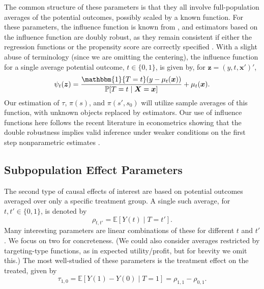 \documentclass[11pt]{article}
\numberwithin{equation}{section}
\theoremstyle{definition}
\newcommand{\E}{\mathbb{E}}
\renewcommand{\P}{\mathbb{P}}
\newcommand{\One}{\mathbbm{1}}
\newcommand{\bz}{\bm{z}}
\newcommand{\bx}{\bm{x}}
\newcommand{\bX}{\bm{X}}
\begin{document}
The common structure of these parameters is that they all involve full-population averages of the potential outcomes, possibly scaled by a known function. For these parameters, the influence function is known from \cite{Hahn1998_Ecma}, and estimators based on the influence function are doubly robust, as they remain consistent if either the regression functions or the propensity score are correctly specified \citep{Robins-Rotnitzky-Zhao1994_JASA,Robins-Rotnitzky-Zhao1995_JASA}. With a slight abuse of terminology (since we are omitting the centering), the influence function for a single average potential outcome, $t \in \{0,1\}$, is given by, for $\bz = (y, t, \bx')'$,
\begin{equation}
	\label{eqn:ate influence}
	\psi_t(\bz) = \frac{  \One\{T = t\} ( y - \mu_t(\bx)) }{\P[T = t \mid \bX = \bx]}  +  \mu_t(\bx).
\end{equation}  
Our estimation of $\tau$, $\pi(s)$, and $\pi(s', s_0)$ will utilize sample averages of this function, with unknown objects replaced by estimators. Our use of influence functions here follows the recent literature in econometrics showing that the double robustness implies valid inference under weaker conditions on the first step nonparametric estimates \citep{Farrell2015_arXiv,Chernozhukov-etal2018_EJ}.






\subsection{Subpopulation Effect Parameters}
	\label{sec:tot}

The second type of causal effects of interest are based on potential outcomes averaged over only a specific treatment group. A single such average, for $t, t' \in \{0,1\}$, is denoted by
\begin{equation}
	\label{eqn:rho}
	\rho_{t,t'} = \E[Y(t) \mid T = t'].
\end{equation}
Many interesting parameters are linear combinations of these for different $t$ and $t'$. We focus on two for concreteness. (We could also consider averages restricted by targeting-type functions, as in expected utility/profit, but for brevity we omit this.) The most well-studied of these parameters is the treatment effect on the treated, given by
\begin{equation}
	\label{eqn:tot}
	\tau_{1,0} = \E[Y(1) - Y(0) \mid T = 1] = \rho_{1,1} - \rho_{0,1}.
\end{equation}
\end{document}
